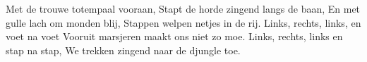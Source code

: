 \beginverse*
Met de trouwe totempaal vooraan,
Stapt de horde zingend langs de baan,
En met gulle lach om monden blij,
Stappen welpen netjes in de rij. 
Links, rechts, links, en voet na voet
Vooruit marsjeren maakt ons niet zo moe.
Links, rechts, links en stap na stap,
We trekken zingend naar de djungle toe. 
\endverse
\endsong